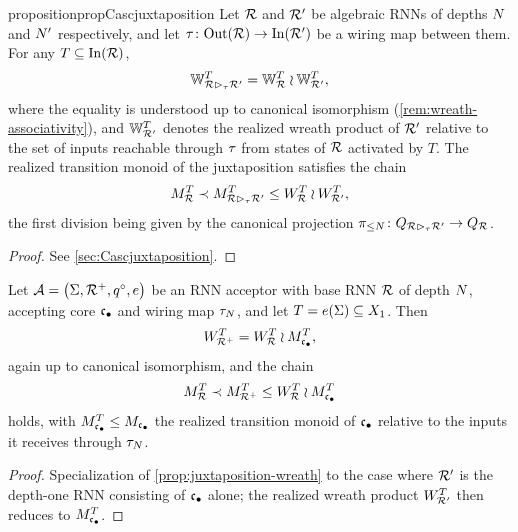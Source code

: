 \documentclass{article}
\begin{document}
\begin{restatable}{proposition}{propCascjuxtaposition}\label{prop:juxtaposition-wreath}
Let $\mathcal{R}$ and $\mathcal{R}'$ be algebraic RNNs of depths $N$ and $N'$ respectively, and let $\tau \colon \mathrm{Out}(\mathcal{R}) \to \mathrm{In}(\mathcal{R}')$ be a wiring map between them. For any $T \subseteq \mathrm{In}(\mathcal{R})$,
$$
\mathbb{W}_{\mathcal{R} \mathbin{\rhd_{\tau}} \mathcal{R}'}^T = \mathbb{W}_{\mathcal{R}}^T \wr \mathbb{W}_{\mathcal{R}'}^T,
$$
where the equality is understood up to canonical isomorphism (\cref{rem:wreath-associativity}), and $\mathbb{W}_{\mathcal{R}'}^T$ denotes the realized wreath product of $\mathcal{R}'$ relative to the set of inputs reachable through $\tau$ from states of $\mathcal{R}$ activated by $T$. 
The realized transition monoid of the juxtaposition satisfies the chain
$$
M_{\mathcal{R}}^T \prec M_{\mathcal{R} \mathbin{\rhd_{\tau}} \mathcal{R}'}^T \leq W_{\mathcal{R}}^T \wr W_{\mathcal{R}'}^T,
$$
the first division being given by the canonical projection $\pi_{\leq N} \colon Q_{\mathcal{R} \mathbin{\rhd_{\tau}} \mathcal{R}'} \to Q_{\mathcal{R}}$.
\end{restatable}
\begin{proof}
  See \cref{sec:Cascjuxtaposition}.
\end{proof}


\begin{corollary}\label{cor:augmentation-wreath}
Let $\mathcal{A} = \bigl(\Sigma,  {\mathcal{R}^{+}}, q^{\circ}, e\bigr)$ be an RNN acceptor with base RNN $\mathcal{R}$ of depth $N$, accepting core ${\mathfrak{c}_{\bullet}}$ and wiring map $\tau_N$, and let $T = e(\Sigma) \subseteq X_1$. Then
$$
W_{{\mathcal{R}^{+}}}^T = W_{\mathcal{R}}^T \wr M_{\mathfrak{c}_{\bullet}}^T,
$$
again up to canonical isomorphism, and the chain
$$
M_{\mathcal{R}}^T \prec M_{{\mathcal{R}^{+}}}^T \leq W_{\mathcal{R}}^T \wr M_{\mathfrak{c}_{\bullet}}^T
$$
holds, with $M_{\mathfrak{c}_{\bullet}}^T \leq M_{\mathfrak{c}_{\bullet}}$ the realized transition monoid of ${\mathfrak{c}_{\bullet}}$ relative to the inputs it receives through $\tau_N$.
\end{corollary}

\begin{proof}
Specialization of \cref{prop:juxtaposition-wreath} to the case where $\mathcal{R}'$ is the depth-one RNN consisting of ${\mathfrak{c}_{\bullet}}$ alone; the realized wreath product $W_{\mathcal{R}'}^T$ then reduces to $M_{\mathfrak{c}_{\bullet}}^T$.
\end{proof}
\end{document}
